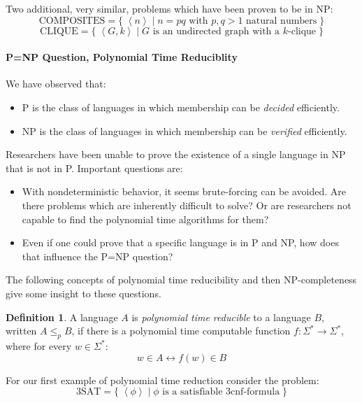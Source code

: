 \documentclass[10pt,fleqn]{article}
\theoremstyle{definition}
\newtheorem{definition}{Definition}
\theoremstyle{remark}
\newcommand{\compositesprob}{\text{COMPOSITES}}
\newcommand{\cliqueprob}{\text{CLIQUE}}
\newcommand{\threesatprob}{\text{3SAT}}
\newcommand{\lpp}{\left \langle}
\newcommand{\rpp}{\right \rangle}
\newcommand{\enc}[1]{\lpp #1 \rpp}
\begin{document}
Two additional, very similar, problems which have been proven to be in NP:
\[
    \compositesprob = \{ \; \enc{n} \mid n = pq \text{ with } p, q > 1 \text{ natural numbers} \; \}
\]
\[
    \cliqueprob = \{ \; \enc{G, k} \mid G \text{ is an undirected graph with a } k\text{-clique} \; \}
\]

\newpage

\paragraph*{P=NP Question, Polynomial Time Reduciblity} We have observed that:
\begin{itemize}
    \item P is the class of languages in which membership can be \emph{decided} efficiently.
    \item NP is the class of languages in which membership can be \emph{verified} efficiently.
\end{itemize}

Researchers have been unable to prove the existence of a single language in NP that is not in P. Important questions are:

\begin{itemize}

    \item With nondeterministic behavior, it seems brute-forcing can be avoided. Are there problems which are inherently difficult to solve? Or are researchers not capable to find the polynomial time algorithms for them?

    \item Even if one could prove that a specific language is in P and NP, how does that influence the P=NP question?

\end{itemize}

The following concepts of polynomial time reducibility and then NP-completeness give some insight to these questions.

\begin{definition} A language \(A\) is \emph{polynomial time reducible} to a language \(B\), written \(A \leq_p B\), if there is a polynomial time computable function \(f\colon \Sigma^* \rightarrow \Sigma^*\), where for every \(w \in \Sigma^*\):
    \[
        w \in A \leftrightarrow f(w) \in B
    \]
\end{definition}
For our first example of polynomial time reduction consider the problem:
\[
    \threesatprob = \{ \; \enc{\phi} \mid \phi \text{ is a satisfiable 3cnf-formula} \; \}
\]
\end{document}
